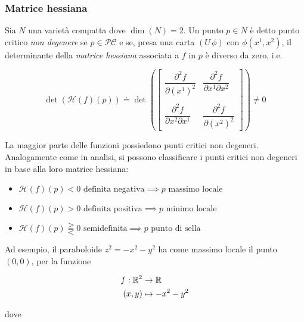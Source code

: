 \subsubsection{Matrice hessiana}

Sia $ N $ una varietà compatta dove $ \dim(N)=2 $. Un punto $ p \in N $  è detto punto critico \textit{non degenere} se $ p \in \mathcal{PC} $ e se, presa una carta $ (U\,\phi) $ con $ \phi (x^{1},x^{2}) $, il determinante della \textit{matrice hessiana} associata a $ f $ in $ p $ è diverso da zero, i.e.

\begin{equation}
	\det(\mathcal{H}(f)(p)) \doteq \det (\begin{bmatrix} \dfrac{\partial^{2} f}{\partial (x^{1})^{2}} & \dfrac{\partial^{2} f}{\partial x^{1} \partial x^{2}} \\\\ \dfrac{\partial^{2} f}{\partial x^{2} \partial x^{1}} & \dfrac{\partial^{2} f}{\partial (x^{2})^{2}} \end{bmatrix}) \neq 0
\end{equation}

La maggior parte delle funzioni possiedono punti critici non degeneri.\\
Analogamente come in analisi, si possono classificare i punti critici non degeneri in base alla loro matrice hessiana:

\begin{itemize}
	\item $ \mathcal{H}(f)(p) < 0 \text{ definita negativa} \implies p \text{ massimo locale} $
	
	\item $ \mathcal{H}(f)(p) > 0 \text{ definita positiva} \implies p \text{ minimo locale} $
	
	\item $ \mathcal{H}(f)(p) \gtreqqless 0 \text{ semidefinita} \implies p \text{ punto di sella} $
\end{itemize}

Ad esempio, il paraboloide $ z^{2} = - x^{2} - y^{2} $ ha come massimo locale il punto $ (0,0) $, per la funzione

\begin{align}
	\begin{split}
		f : \mathbb{R}^{2} &\to \mathbb{R}\\
		(x,y) &\mapsto - x^{2} - y^{2}
	\end{split}
\end{align}

dove

